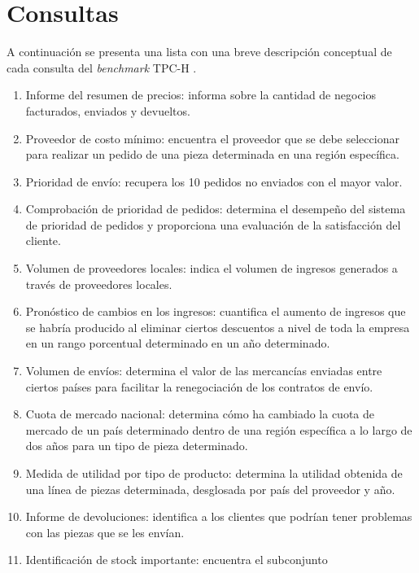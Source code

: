 \documentclass[12pt, letter paper]{report}
\begin{document}
  \section{Consultas} %
  \label{sec:consultas}
    A continuación se presenta una lista con una breve descripción conceptual
    de cada consulta del \textit{benchmark} TPC-H
    \cite{transactionprocessingperformancecounciltpctpc2022}.
      \begin{enumerate}
        \item Informe del resumen de precios: informa sobre la cantidad de
        negocios facturados, enviados y devueltos.
        \item Proveedor de costo mínimo: encuentra el proveedor que se debe
        seleccionar para realizar un pedido de una pieza determinada en una
        región específica.
        \item Prioridad de envío: recupera los 10 pedidos no enviados con el
        mayor valor.
        \item Comprobación de prioridad de pedidos: determina el desempeño
        del sistema de prioridad de pedidos y proporciona una evaluación de
        la satisfacción del cliente.
        \item Volumen de proveedores locales: indica el volumen de ingresos
        generados a través de proveedores locales.
        \item Pronóstico de cambios en los ingresos: cuantifica el aumento
        de ingresos que se habría producido al eliminar ciertos descuentos a
        nivel de toda la empresa en un rango porcentual determinado en un
        año determinado.
        \item Volumen de envíos: determina el valor de las mercancías
        enviadas entre ciertos países para facilitar la renegociación de los
        contratos de envío.
        \item Cuota de mercado nacional: determina cómo ha cambiado la cuota
        de mercado de un país determinado dentro de una región específica a
        lo largo de dos años para un tipo de pieza determinado.
        \item Medida de utilidad por tipo de producto: determina la utilidad
        obtenida de una línea de piezas determinada, desglosada por país del
        proveedor y año.
        \item Informe de devoluciones: identifica a los clientes que podrían
        tener problemas con las piezas que se les envían.
        \item Identificación de stock importante: encuentra el subconjunto

\end{enumerate}
\end{document}
